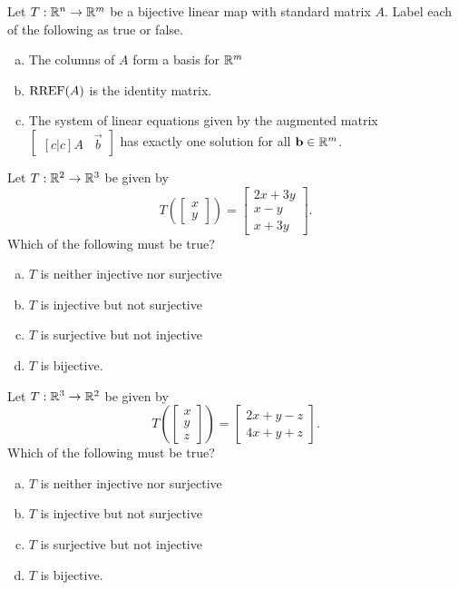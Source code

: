 \begin{applicationActivities}
\begin{activity}{5}
Let $T: \mathbb{R}^n \rightarrow \mathbb{R}^m$ be a bijective linear map with
standard matrix $A$. Label each of the following as true or false.
\begin{enumerate}[(a)]
\item The columns of $A$ form a basis for $\mathbb{R}^m$
\item $\operatorname{RREF}(A)$ is the identity matrix.
\item The system of linear equations given by the augmented matrix $\begin{bmatrix}[c|c] A & \vec{b} \end{bmatrix}$ has exactly one solution
for all \(\mathbf b \in \mathbb{R}^m\).
\end{enumerate}
\end{activity}

\begin{activity}{10}
Let $T: \mathbb{R}^2 \rightarrow \mathbb{R}^3$ be given by $$T\left(\begin{bmatrix} x \\ y \end{bmatrix} \right) = \begin{bmatrix} 2x+3y \\ x-y \\ x+3y\end{bmatrix}.$$  Which of the following must be true?
\begin{enumerate}[(a)]
\item $T$ is neither injective nor surjective
\item $T$ is injective but not surjective
\item $T$ is surjective but not injective
\item $T$ is bijective.
\end{enumerate}
\end{activity}

\begin{activity}{5}
Let $T: \mathbb{R}^3 \rightarrow \mathbb{R}^2$ be given by $$T\left(\begin{bmatrix} x \\ y  \\ z \end{bmatrix} \right) = \begin{bmatrix} 2x+y-z \\ 4x+y+z\end{bmatrix}.$$  Which of the following must be true?
\begin{enumerate}[(a)]
\item $T$ is neither injective nor surjective
\item $T$ is injective but not surjective
\item $T$ is surjective but not injective
\item $T$ is bijective.
\end{enumerate}
\end{activity}


\end{applicationActivities}
